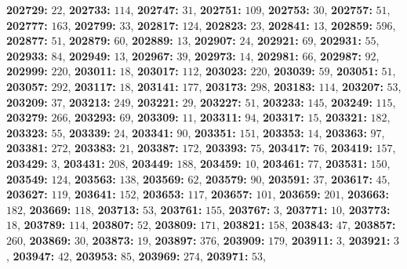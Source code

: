 \textsf{\bfseries 202729:} $22$, \textsf{\bfseries 202733:} $114$, \textsf{\bfseries 202747:} $31$, \textsf{\bfseries 202751:} $109$, \textsf{\bfseries 202753:} $30$, \textsf{\bfseries 202757:} $51$, \textsf{\bfseries 202777:} $163$, \textsf{\bfseries 202799:} $33$, \textsf{\bfseries 202817:} $124$, \textsf{\bfseries 202823:} $23$, \textsf{\bfseries 202841:} $13$, \textsf{\bfseries 202859:} $596$, \textsf{\bfseries 202877:} $51$, \textsf{\bfseries 202879:} $60$, \textsf{\bfseries 202889:} $13$, \textsf{\bfseries 202907:} $24$, \textsf{\bfseries 202921:} $69$, \textsf{\bfseries 202931:} $55$, \textsf{\bfseries 202933:} $84$, \textsf{\bfseries 202949:} $13$, \textsf{\bfseries 202967:} $39$, \textsf{\bfseries 202973:} $14$, \textsf{\bfseries 202981:} $66$, \textsf{\bfseries 202987:} $92$, \textsf{\bfseries 202999:} $220$, \textsf{\bfseries 203011:} $18$, \textsf{\bfseries 203017:} $112$, \textsf{\bfseries 203023:} $220$, \textsf{\bfseries 203039:} $59$, \textsf{\bfseries 203051:} $51$, \textsf{\bfseries 203057:} $292$, \textsf{\bfseries 203117:} $18$, \textsf{\bfseries 203141:} $177$, \textsf{\bfseries 203173:} $298$, \textsf{\bfseries 203183:} $114$, \textsf{\bfseries 203207:} $53$, \textsf{\bfseries 203209:} $37$, \textsf{\bfseries 203213:} $249$, \textsf{\bfseries 203221:} $29$, \textsf{\bfseries 203227:} $51$, \textsf{\bfseries 203233:} $145$, \textsf{\bfseries 203249:} $115$, \textsf{\bfseries 203279:} $266$, \textsf{\bfseries 203293:} $69$, \textsf{\bfseries 203309:} $11$, \textsf{\bfseries 203311:} $94$, \textsf{\bfseries 203317:} $15$, \textsf{\bfseries 203321:} $182$, \textsf{\bfseries 203323:} $55$, \textsf{\bfseries 203339:} $24$, \textsf{\bfseries 203341:} $90$, \textsf{\bfseries 203351:} $151$, \textsf{\bfseries 203353:} $14$, \textsf{\bfseries 203363:} $97$, \textsf{\bfseries 203381:} $272$, \textsf{\bfseries 203383:} $21$, \textsf{\bfseries 203387:} $172$, \textsf{\bfseries 203393:} $75$, \textsf{\bfseries 203417:} $76$, \textsf{\bfseries 203419:} $157$, \textsf{\bfseries 203429:} $3$, \textsf{\bfseries 203431:} $208$, \textsf{\bfseries 203449:} $188$, \textsf{\bfseries 203459:} $10$, \textsf{\bfseries 203461:} $77$, \textsf{\bfseries 203531:} $150$, \textsf{\bfseries 203549:} $124$, \textsf{\bfseries 203563:} $138$, \textsf{\bfseries 203569:} $62$, \textsf{\bfseries 203579:} $90$, \textsf{\bfseries 203591:} $37$, \textsf{\bfseries 203617:} $45$, \textsf{\bfseries 203627:} $119$, \textsf{\bfseries 203641:} $152$, \textsf{\bfseries 203653:} $117$, \textsf{\bfseries 203657:} $101$, \textsf{\bfseries 203659:} $201$, \textsf{\bfseries 203663:} $182$, \textsf{\bfseries 203669:} $118$, \textsf{\bfseries 203713:} $53$, \textsf{\bfseries 203761:} $155$, \textsf{\bfseries 203767:} $3$, \textsf{\bfseries 203771:} $10$, \textsf{\bfseries 203773:} $18$, \textsf{\bfseries 203789:} $114$, \textsf{\bfseries 203807:} $52$, \textsf{\bfseries 203809:} $171$, \textsf{\bfseries 203821:} $158$, \textsf{\bfseries 203843:} $47$, \textsf{\bfseries 203857:} $260$, \textsf{\bfseries 203869:} $30$, \textsf{\bfseries 203873:} $19$, \textsf{\bfseries 203897:} $376$, \textsf{\bfseries 203909:} $179$, \textsf{\bfseries 203911:} $3$, \textsf{\bfseries 203921:} $3$, \textsf{\bfseries 203947:} $42$, \textsf{\bfseries 203953:} $85$, \textsf{\bfseries 203969:} $274$, \textsf{\bfseries 203971:} $53$, 
